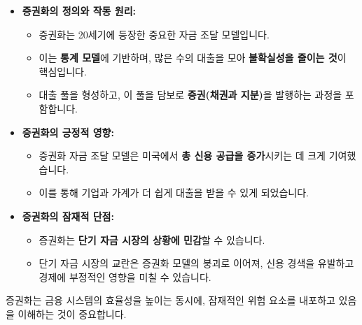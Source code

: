 \documentclass[11pt,a4paper]{article}
\theoremstyle{definition}
\begin{document}
\begin{tcolorbox}[
    colback=lightgreen,
    colframe=darkgreen,
    title=\textbf{학습 내용 요약}
]
  \begin{itemize}
    \item \textbf{증권화의 정의와 작동 원리:}
      \begin{itemize}
        \item 증권화는 20세기에 등장한 중요한 자금 조달 모델입니다.
        \item 이는 \textbf{통계 모델}에 기반하며, 많은 수의 대출을 모아 \textbf{불확실성을 줄이는 것}이 핵심입니다.
        \item 대출 풀을 형성하고, 이 풀을 담보로 \textbf{증권(채권과 지분)}을 발행하는 과정을 포함합니다.
      \end{itemize}
    \item \textbf{증권화의 긍정적 영향:}
      \begin{itemize}
        \item 증권화 자금 조달 모델은 미국에서 \textbf{총 신용 공급을 증가}시키는 데 크게 기여했습니다.
        \item 이를 통해 기업과 가계가 더 쉽게 대출을 받을 수 있게 되었습니다.
      \end{itemize}
    \item \textbf{증권화의 잠재적 단점:}
      \begin{itemize}
        \item 증권화는 \textbf{단기 자금 시장의 상황에 민감}할 수 있습니다.
        \item 단기 자금 시장의 교란은 증권화 모델의 붕괴로 이어져, 신용 경색을 유발하고 경제에 부정적인 영향을 미칠 수 있습니다.
      \end{itemize}
  \end{itemize}
  증권화는 금융 시스템의 효율성을 높이는 동시에, 잠재적인 위험 요소를 내포하고 있음을 이해하는 것이 중요합니다.
\end{tcolorbox}
\end{document}
